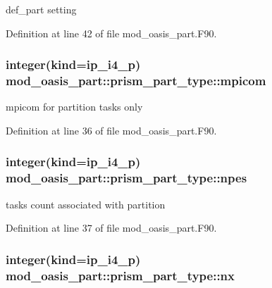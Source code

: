 def\+\_\+part setting 



Definition at line 42 of file mod\+\_\+oasis\+\_\+part.\+F90.

\hypertarget{structmod__oasis__part_1_1prism__part__type_a5aaf8efdc7391d2a64f269dd97055612}{
\subsubsection[{mpicom}]{\setlength{\rightskip}{0pt plus 5cm}integer(kind=ip\+\_\+i4\+\_\+p) mod\+\_\+oasis\+\_\+part\+::prism\+\_\+part\+\_\+type\+::mpicom\hspace{0.3cm}{\ttfamily [private]}}}\label{structmod__oasis__part_1_1prism__part__type_a5aaf8efdc7391d2a64f269dd97055612}


mpicom for partition tasks only 



Definition at line 36 of file mod\+\_\+oasis\+\_\+part.\+F90.

\hypertarget{structmod__oasis__part_1_1prism__part__type_a3f129d8d5ee4ccf7b071febc1c3f37c3}{
\subsubsection[{npes}]{\setlength{\rightskip}{0pt plus 5cm}integer(kind=ip\+\_\+i4\+\_\+p) mod\+\_\+oasis\+\_\+part\+::prism\+\_\+part\+\_\+type\+::npes\hspace{0.3cm}{\ttfamily [private]}}}\label{structmod__oasis__part_1_1prism__part__type_a3f129d8d5ee4ccf7b071febc1c3f37c3}


tasks count associated with partition 



Definition at line 37 of file mod\+\_\+oasis\+\_\+part.\+F90.

\hypertarget{structmod__oasis__part_1_1prism__part__type_a7640ce8e1943f2fc70c8b072795502b2}{
\subsubsection[{nx}]{\setlength{\rightskip}{0pt plus 5cm}integer(kind=ip\+\_\+i4\+\_\+p) mod\+\_\+oasis\+\_\+part\+::prism\+\_\+part\+\_\+type\+::nx\hspace{0.3cm}{\ttfamily [private]}}}\label{structmod__oasis__part_1_1prism__part__type_a7640ce8e1943f2fc70c8b072795502b2}


